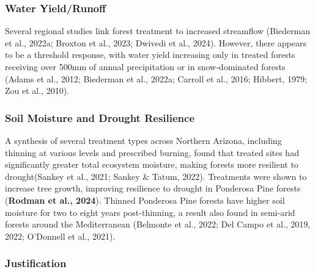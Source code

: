 \documentclass[
]{agujournal2019}
\begin{document}
\subsubsection{Water Yield/Runoff}\label{water-yieldrunoff}

Several regional studies link forest treatment to increased streamflow
(Biederman et al., 2022a; Broxton et al., 2023; Dwivedi et al., 2024).
However, there appears to be a threshold response, with water yield
increasing only in treated forests receiving over 500mm of annual
precipitation or in snow-dominated forests (Adams et al., 2012;
Biederman et al., 2022a; Carroll et al., 2016; Hibbert, 1979; Zou et
al., 2010).

\subsubsection{Soil Moisture and Drought
Resilience}\label{soil-moisture-and-drought-resilience}

A synthesis of several treatment types across Northern Arizona,
including thinning at various levels and prescribed burning, found that
treated sites had significantly greater total ecosystem moisture, making
forests more resilient to drought(Sankey et al., 2021; Sankey \& Tatum,
2022). Treatments were shown to increase tree growth, improving
resilience to drought in Ponderosa Pine forests (\textbf{Rodman et al.,
2024}). Thinned Ponderosa Pine forests have higher soil moisture for two
to eight years post-thinning, a result also found in semi-arid forests
around the Mediterranean (Belmonte et al., 2022; Del Campo et al., 2019,
2022; O'Donnell et al., 2021).

\subsubsection{Justification}\label{justification}
\end{document}
